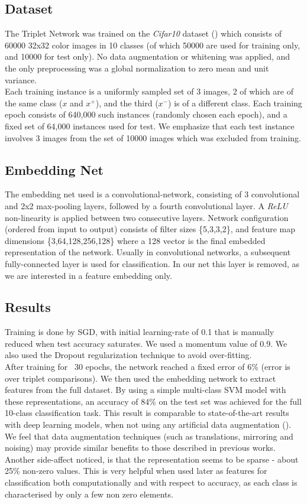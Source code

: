 \documentclass{article} %
\begin{document}
\subsection{Dataset}
The Triplet Network was trained on the \emph{Cifar10} dataset (\citet{krizhevsky2009learning}) which consists of 60000 32x32 color images in 10 classes (of which 50000 are used for training only, and 10000 for test only). No data augmentation or whitening was applied, and the only preprocessing was a global normalization to zero mean and unit variance.\\
Each training instance is a uniformly sampled set of 3 images, 2 of which are of the same class ($x$ and $x^{+}$), and the third ($x^{-}$) is of a different class. Each training epoch consists of 640,000 such instances (randomly chosen each epoch), and a fixed set of 64,000 instances used for test. We emphasize that each test instance involves 3 images from the set of 10000 images which was excluded from training.
\subsection{Embedding Net}
The embedding net used is a convolutional-network, consisting of 3 convolutional and 2x2 max-pooling layers, followed by a fourth convolutional layer. A \emph{ReLU} non-linearity is applied between two consecutive layers.
Network configuration (ordered from input to output) consists of filter sizes \{5,3,3,2\}, and feature map dimensions \{3,64,128,256,128\} where a 128 vector is the final embedded representation of the network. Usually in convolutional networks, a subsequent fully-connected
layer is used for classification. In our net this layer is removed, as we are interested in a feature embedding only.


\subsection{Results}
Training is done by SGD, with initial learning-rate of 0.1 that is manually reduced when test accuracy saturates. We used a momentum value of 0.9. We also used the Dropout regularization technique to avoid over-fitting.\\
After training for ~30 epochs, the network reached a fixed error of 6\% (error is over triplet comparisons).
We then used the embedding network to extract features from the full dataset. By using a simple multi-class SVM model with these representations, an accuracy of 84\% on the test set was achieved for the full 10-class classification task.
This result is comparable to state-of-the-art results with deep learning models, when not using any artificial data augmentation (\citet{zeiler2013stochastic,goodfellow2013maxout,LinCY13}). We feel that data augmentation techniques (such as translations, mirroring and noising) may provide similar benefits to those described in previous works.\\
Another side-affect noticed, is that the representation seems to be sparse - about 25\% non-zero values. This is very helpful when used later as features for classification both computationally and with respect to accuracy, as each class is characterised by only a few non zero elements.
\end{document}
